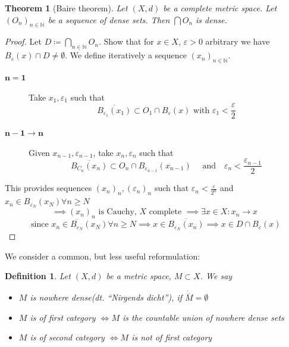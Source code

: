 \documentclass[a4paper]{article}
\newcounter{lecref}[section]
\numberwithin{lecref}{section}
\newtheorem{theorem}[lecref]{Theorem}
\newtheorem{definition}[lecref]{Definition}
\newcommand{\dt}[1]{(dt. \enquote{\foreignlanguage{german}{#1}})}
\begin{document}
\begin{theorem}[Baire theorem]
	\label{theorem:1.23}
	Let $(X, d)$ be a complete metric space.
	Let $\left(O_n\right)_{n \in \mathbb N}$ be a sequence of dense sets.
	Then $\bigcap O_n$ is dense.
\end{theorem}
\begin{proof}
	Let $D \coloneqq \bigcap_{n \in \mathbb N} O_n$. Show that for $x \in X$, $\varepsilon > 0$ arbitrary we have $B_{\varepsilon}(x) \cap D \neq \emptyset$.
	We define iteratively a sequence $(x_n)_{n \in \mathbb N}$.

	\begin{description}
		\item[$\mathbf{n = 1}$] Take $x_1, \varepsilon_1$ such that
			\[ \overline{B_{\varepsilon_1}(x_1)} \subset O_1 \cap B_{\varepsilon}(x) \text{ with } \varepsilon_1 < \frac\varepsilon2 \]
		\item[$\mathbf{n-1\to n}$] Given $x_{n-1}, \varepsilon_{n-1}$, take $x_n, \varepsilon_n$ such that
			\[ \overline{B_{C_n}(x_n)} \subset O_n \cap B_{\varepsilon_{n-1}}(x_{n-1}) \quad \text{ and} \quad \varepsilon_n < \frac{\varepsilon_{n-1}}{2} \]
	\end{description}

	This provides sequences $(x_n)_n, (\varepsilon_n)_n$ such that $\varepsilon_n < \frac\varepsilon{2^n}$ and $x_n \in B_{\varepsilon_N}(x_N) \forall n \geq N$
	\[ \implies (x_n)_n \text{ is Cauchy, } X \text{ complete } \implies \exists x \in X: x_n \to x \]
	\[ \text{ since } x_n \in \overline{B_{\varepsilon_N}}(x_N) \forall n \geq N \implies x \in \overline{B_{\varepsilon_N}(x_n)} \implies x \in D \cap B_{\varepsilon}(x) \]
\end{proof}

We consider a common, but less useful reformulation:

\begin{definition}
	\label{defintion:1.24}
	Let $(X, d)$ be a metric space, $M \subset X$. We say
	\begin{itemize}
		\item $M$ is \emph{nowhere dense}\dt{Nirgends dicht}, if $\mathring{\overline M} = \emptyset$
		\item $M$ is of \emph{first category} $\iff M$ is the countable union of nowhere dense sets
		\item $M$ is of \emph{second category} $\iff M$ is not of first category
	\end{itemize}
\end{definition}
\end{document}
